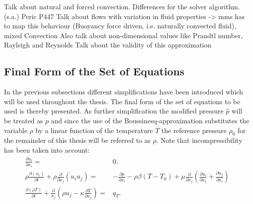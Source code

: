       Talk about natural and forced convection. Differences for the solver algorithm. (s.a.) Peric P447
      Talk about flows with variation in fluid properties -> mms has to map this behaviour (Buoyancy force driven, i.e. naturally convected fluid), mixed Convection
      Also talk about non-dimensional values like Prandtl number, Rayleigh and Reynolds
      Talk about the validity of this approximation
      
    \subsection{Final Form of the Set of Equations}

    In the previous subsections different simplifications have been introduced which will be used throughout the thesis. The final form of the set of equations to be used is thereby presented. As further simplification the modified pressure \(\hat{p}\) will be treated as \(p\) and since the use of the Boussinesq-approximation substitutes the variable \(\rho\) by a linear function of the temperature \(T\) the reference pressure \(\rho_0\) for the remainder of this thesis will be referred to as \(\rho\). Note that incompressibility has been taken into account:
    \begin{align}
      \label{eq:contidiff}
      \frac{\partial u_i}{\partial x_i} =& 0. \\
      \label{eq:momentumdiff}
        \rho \frac{\partial \left( u_i \right)}{\partial t} 
        + \rho \frac{\partial}{\partial x_j} \left( u_i  u_j \right) 
        =& - \frac{\partial p}{\partial x_i} 
        - \rho \beta \left( T - T_0 \right)
        +  \mu \frac{\partial}{\partial x_j} \left( \frac{\partial u_i}{\partial x_j} 
                                             + \frac{\partial u_j}{\partial x_i} \right) \\
    \label{eq:temperaturediff}
    \frac{\partial \left(\rho T \right)}{\partial t} + \frac{\partial}{x_j} \left( \rho u_j - \kappa \frac{\partial T}{\partial x_j} \right) =& q_T.
    \end{align}

